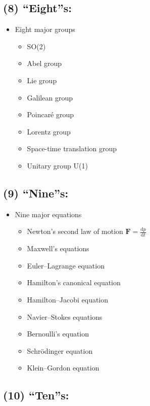 \subsection*{(8) ``Eight''s:}\label{eights}

\begin{itemize}
\tightlist{}
\item
  Eight major groups

  \begin{itemize}
\tightlist{}
  \item
    SO(2)
  \item
    Abel group
  \item
    Lie group
  \item
    Galilean group
  \item
    Poincaré group
  \item
    Lorentz group
  \item
    Space-time translation group
  \item
    Unitary group U(1)
  \end{itemize}
\end{itemize}

\subsection*{(9) ``Nine''s:}\label{nines}

\begin{itemize}
\tightlist{}
\item
  Nine major equations

  \begin{itemize}
\tightlist{}
  \item
    Newton's second law of motion
    \(\displaystyle \boldsymbol{F} = \frac{\mathrm{d}p}{\mathrm{d}t}\)
  \item
    Maxwell's equations
  \item
    Euler--Lagrange equation
  \item
    Hamilton's canonical equation
  \item
    Hamilton--Jacobi equation
  \item
    Navier--Stokes equations
  \item
    Bernoulli's equation
  \item
    Schrödinger equation
  \item
    Klein--Gordon equation
  \end{itemize}
\end{itemize}

\subsection*{(10) ``Ten''s:}\label{tens}

